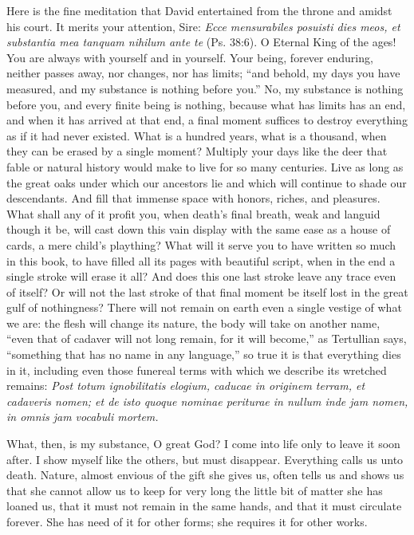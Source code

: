\documentclass[10pt, twoside]{article}
\begin{document}
Here is the fine meditation that David entertained from the throne and amidst his court. It merits your attention, Sire: \textit{Ecce mensurabiles posuisti dies meos, et substantia mea tanquam nihilum ante te} (Ps. 38:6). O Eternal King of the ages! You are always with yourself and in yourself. Your being, forever enduring, neither passes away, nor changes, nor has limits; ``and behold, my days you have measured, and my substance is nothing before you.'' No, my substance is nothing before you, and every finite being is nothing, because what has limits has an end, and when it has arrived at that end, a final moment suffices to destroy everything as if it had never existed. What is a hundred years, what is a thousand, when they can be erased by a single moment? Multiply your days like the deer that fable or natural history would make to live for so many centuries. Live as long as the great oaks under which our ancestors lie and which will continue to shade our descendants. And fill that immense space with honors, riches, and pleasures. What shall any of it profit you, when death's final breath, weak and languid though it be, will cast down this vain display with the same ease as a house of cards, a mere child's plaything? What will it serve you to have written so much in this book, to have filled all its pages with beautiful script, when in the end a single stroke will erase it all? And does this one last stroke leave any trace even of itself? Or will not the last stroke of that final moment be itself lost in the great gulf of nothingness? There will not remain on earth even a single vestige of what we are: the flesh will change its nature, the body will take on another name, ``even that of cadaver will not long remain, for it will become,'' as Tertullian says, ``something that has no name in any language,'' so true it is that everything dies in it, including even those funereal terms with which we describe its wretched remains: \textit{Post totum ignobilitatis elogium, caducae in originem terram, et cadaveris nomen; et de isto quoque nominae periturae in nullum inde jam nomen, in omnis jam vocabuli mortem.}

What, then, is my substance, O great God? I come into life only to leave it soon after. I show myself like the others, but must disappear. Everything calls us unto death. Nature, almost envious of the gift she gives us, often tells us and shows us that she cannot allow us to keep for very long the little bit of matter she has loaned us, that it must not remain in the same hands, and that it must circulate forever. She has need of it for other forms; she requires it for other works.
\end{document}
